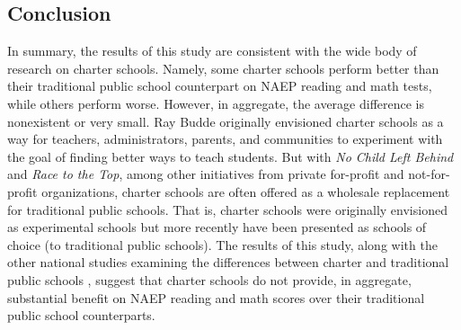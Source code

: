 \documentclass[letterpaper,12p,twoside]{article} %
\begin{document}

\subsection{Conclusion}

In summary, the results of this study are consistent with the wide body of research on charter schools. Namely, some charter schools perform better than their traditional public school counterpart on NAEP reading and math tests, while others perform worse. However, in aggregate, the average difference is nonexistent or very small. Ray Budde \citeyear{Budde1988} originally envisioned charter schools as a way for teachers, administrators, parents, and communities to experiment with the goal of finding better ways to teach students. But with \textit{No Child Left Behind} and \textit{Race to the Top}, among other initiatives from private for-profit and not-for-profit organizations, charter schools are often offered as a wholesale replacement for traditional public schools. That is, charter schools were originally envisioned as experimental schools but more recently have been presented as schools of choice (to traditional public schools). The results of this study, along with the other national studies examining the differences between charter and traditional public schools \cite{credo,credo2013,BraunJenkinsGrigg2006}, suggest that charter schools do not provide, in aggregate, substantial benefit on NAEP reading and math scores over their traditional public school counterparts.


\cleardoublepage




\end{document}
